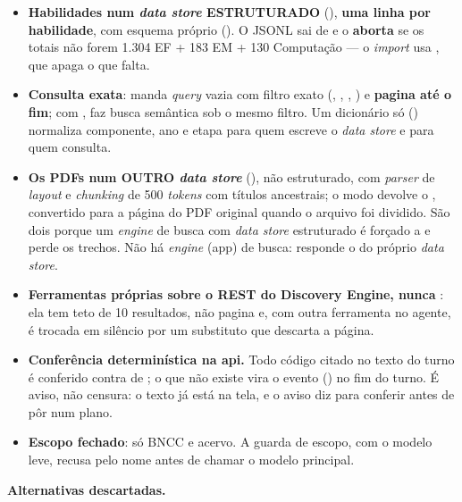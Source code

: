 \begin{itemize}
  \item \textbf{Habilidades num \emph{data store} ESTRUTURADO}
    (), \textbf{uma linha por habilidade}, com
    esquema próprio (). O JSONL sai de 
    e o  \textbf{aborta} se os totais não forem
    1.304 EF + 183 EM + 130 Computação --- o \emph{import} usa
     , que apaga o que falta.
  \item \textbf{Consulta exata}:  manda \emph{query}
    vazia com filtro exato (, , ,
    ) e \textbf{pagina até o fim}; com , faz busca semântica
    sob o mesmo filtro. Um dicionário só () normaliza
    componente, ano e etapa para quem escreve o \emph{data store} e para quem
    consulta.
  \item \textbf{Os PDFs num OUTRO \emph{data store}}
    (), não estruturado, com \emph{parser} de
    \emph{layout} e \emph{chunking} de 500 \emph{tokens} com títulos ancestrais; o
    modo  devolve o , convertido para a página do PDF
    original quando o arquivo foi dividido. São dois porque um \emph{engine} de
    busca com \emph{data store} estruturado é forçado a  e perde os
    trechos. Não há \emph{engine} (app) de busca: responde o
     do próprio \emph{data store}.
  \item \textbf{Ferramentas próprias sobre o REST do Discovery Engine, nunca
    }: ela tem teto de 10 resultados, não pagina e, com
    outra ferramenta no agente, é trocada em silêncio por um substituto que
    descarta a página.
  \item \textbf{Conferência determinística na api.} Todo código citado no texto
    do turno é conferido contra  de ;
    o que não existe vira o evento  () no
    fim do turno. É aviso, não censura: o texto já está na tela, e o aviso diz
    para conferir antes de pôr num plano.
  \item \textbf{Escopo fechado}: só BNCC e acervo. A guarda de escopo, com o
    modelo leve, recusa pelo nome antes de chamar o modelo principal.
\end{itemize}

\textbf{Alternativas descartadas.}

